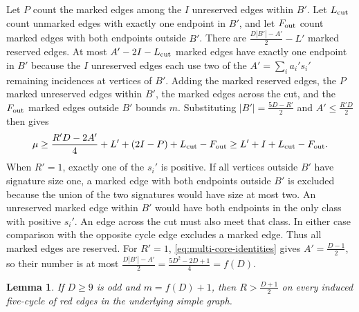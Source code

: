 \documentclass[preprint,11pt,numbers]{elsarticle-arxiv}
\numberwithin{equation}{section}
\newtheorem{lemma}[theorem]{Lemma}
\theoremstyle{definition}
\begin{document}
Let $P$ count the marked edges among the $I$ unreserved edges
within $B'$. Let $L_{\rm cut}$ count unmarked edges with exactly
one endpoint in $B'$, and let $F_{\rm out}$ count marked edges
with both endpoints outside $B'$. There are
$\frac{D|B'|-A'}{2}-L'$ marked reserved edges. At most
$A'-2I-L_{\rm cut}$ marked edges have exactly one endpoint in
$B'$ because the $I$ unreserved edges each use two of the
$A'=\sum_i a_i's_i'$ remaining incidences at vertices of $B'$.
Adding the marked reserved edges, the $P$ marked unreserved
edges within $B'$, the marked edges across the cut, and the
$F_{\rm out}$ marked edges outside $B'$ bounds $m$. Substituting
$|B'|=\frac{5D-R'}{2}$ and $A'\le\frac{R'D}{2}$ then gives
\begin{equation}\label{eq:multi-extra-capacity}
 \mu\ge \frac{R'D-2A'}{4}+L'+(2I-P)+L_{\rm cut}-F_{\rm out}
 \ge L'+I+L_{\rm cut}-F_{\rm out} .
\end{equation}
When $R'=1$, exactly one of the $s_i'$ is positive. If all
vertices outside $B'$ have signature size one, a marked edge
with both endpoints outside $B'$ is excluded because the union
of the two signatures would have size at most two. An unreserved
marked edge within $B'$ would have both endpoints in the only
class with positive $s_i'$. An edge across the cut must also
meet that class. In either case comparison with the opposite
cycle edge excludes a marked edge. Thus all marked edges are
reserved. For $R'=1$, \eqref{eq:multi-core-identities} gives
$A'=\frac{D-1}{2}$, so their number is at most
$\frac{D|B'|-A'}{2}=\frac{5D^2-2D+1}{4}=f(D)$.

\begin{lemma}\label{lem:half-degree-cycle}
If $D\ge9$ is odd and $m=f(D)+1$, then $R>\frac{D+1}{2}$ on
every induced five-cycle of red edges in the underlying simple graph.
\end{lemma}
\end{document}
